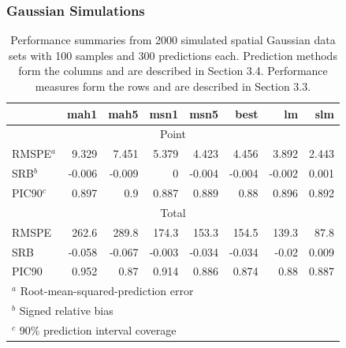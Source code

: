 \documentclass[mathserif,compress]{beamer}\usepackage{graphicx, color}
\begin{document}
\begin{frame}[fragile]
\frametitle{Gaussian Simulations}


\begin{table}[ht]
\caption{\tiny Performance summaries from 2000 simulated spatial Gaussian data sets with 100 samples and 300 predictions each. Prediction methods form the columns and are described in Section 3.4.  Performance measures form the rows and are described in Section 3.3. \label{GAUSsummary}}
\scriptsize
\begin{center}
\begin{tabular}{|l r r r r r r r|}
\hline
\hline
  & mah1 & mah5 & msn1 & msn5 & best & lm & slm \\
\hline
\hline
\multicolumn{8}{|c|}{Point} \\
RMSPE$^a$ & 9.329 & 7.451 & 5.379 & 4.423 & 4.456 & 3.892 & 2.443 \\
SRB$^b$ & -0.006 & -0.009 & 0 & -0.004 & -0.004 & -0.002 & 0.001 \\
PIC90$^c$ & 0.897 & 0.9 & 0.887 & 0.889 & 0.88 & 0.896 & 0.892 \\
\multicolumn{8}{|c|}{Total} \\
RMSPE & 262.6 & 289.8 & 174.3 & 153.3 & 154.5 & 139.3 & 87.8 \\
SRB & -0.058 & -0.067 & -0.003 & -0.034 & -0.034 & -0.02 & 0.009 \\
PIC90 & 0.952 & 0.87 & 0.914 & 0.886 & 0.874 & 0.88 & 0.887 \\
\hline
\multicolumn{8}{l}{$^a$ Root-mean-squared-prediction error} \\
\multicolumn{8}{l}{$^b$ Signed relative bias} \\
\multicolumn{8}{l}{$^c$ 90\% prediction interval coverage} \\
\end{tabular}
\end{center}
\end{table}%
%
\end{frame}
\end{document}
